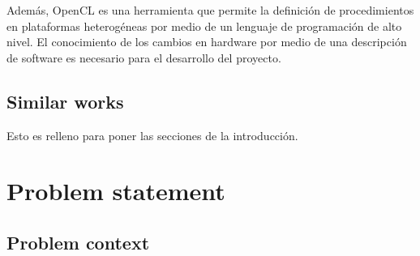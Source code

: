 Además, OpenCL es una herramienta que permite la definición de procedimientos en plataformas heterogéneas 
por medio de un lenguaje de programación de alto nivel. El conocimiento de los cambios en hardware por medio 
de una descripción de software es necesario para el desarrollo del proyecto.

\subsection{Similar works}

Esto es relleno para poner las secciones de la introducción.

\section{Problem statement}

\subsection{Problem context}

